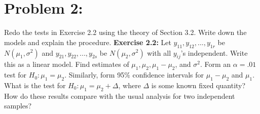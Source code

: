 \documentclass[11pt]{article}
\begin{document}
\section*{Problem 2:}  Redo the tests in Exercise 2.2 using the theory of Section 3.2.  Write down the models and explain the procedure.  {\bf Exercise 2.2:}  Let $y_{11},y_{12},...,y_{1r}$ be $N(\mu_1,\sigma^2)$ and $y_{21},y_{22},...,y_{2s}$ be $N(\mu_2,\sigma^2)$ with all $y_{ij}$'s independent.  Write this as a linear model.  Find estimates of $\mu_1,\mu_2,\mu_1-\mu_2$, and $\sigma^2$.  Form an $\alpha = .01$ test for $H_0\colon \mu_1 = \mu_2$.  Similarly, form 95$\%$ confidence intervals for $\mu_1-\mu_2$ and $\mu_1$.  What is the test for $H_0\colon\mu_1 = \mu_2 + \Delta$, where $\Delta$ is some known fixed quantity?  How do these results compare with the usual analysis for two independent samples?
\end{document}
